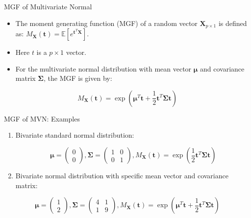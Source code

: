 \documentclass[
  ignorenonframetext,
]{beamer}
\providecommand{\tightlist}{%
  \setlength{\itemsep}{0pt}\setlength{\parskip}{0pt}}
\begin{document}
\begin{frame}{MGF of Multivariate Normal}
\protect\hypertarget{mgf-of-multivariate-normal}{}
\begin{itemize}
\tightlist
\item
  The moment generating function (MGF) of a random vector
  \(\mathbf{X}_{p\times 1}\) is defined as:
  \(M_{\mathbf{X}}(\mathbf{t}) = \mathbb{E}[e^{\mathbf{t}^T\mathbf{X}}]\).
\item
  Here \(t\) is a \(p\times 1\) vector.\\
\item
  For the multivariate normal distribution with mean vector
  \(\boldsymbol{\mu}\) and covariance matrix \(\boldsymbol{\Sigma}\),
  the MGF is given by:
\end{itemize}

\[
M_{\mathbf{X}}(\mathbf{t}) = \exp\left( \boldsymbol{\mu}^T \mathbf{t} + \frac{1}{2} \mathbf{t}^T \boldsymbol{\Sigma} \mathbf{t} \right)
\]
\end{frame}

\begin{frame}{MGF of MVN: Examples}
\protect\hypertarget{mgf-of-mvn-examples}{}
\begin{enumerate}
\item
  Bivariate standard normal distribution:

  \[\boldsymbol{\mu}=\begin{pmatrix}0 \\ 0\end{pmatrix}, \boldsymbol{\Sigma}=\begin{pmatrix}1 & 0 \\ 0 & 1\end{pmatrix}, M_{\mathbf{X}}(\mathbf{t}) = \exp\left(\frac{1}{2} \mathbf{t}^T \boldsymbol{\Sigma} \mathbf{t}\right)
  \]
\item
  Bivariate normal distribution with specific mean vector and covariance
  matrix:
\end{enumerate}

\[\boldsymbol{\mu}=\begin{pmatrix}1 \\ 2\end{pmatrix},
\boldsymbol{\Sigma}=\begin{pmatrix}4 & 1 \\ 1 & 9\end{pmatrix},    M_{\mathbf{X}}(\mathbf{t}) = \exp\left(\boldsymbol{\mu}^T \mathbf{t} + \frac{1}{2} \mathbf{t}^T \boldsymbol{\Sigma} \mathbf{t}\right)
\]
\end{frame}
\end{document}
